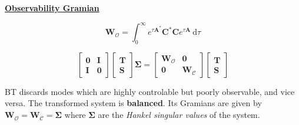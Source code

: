 \documentclass[aspectratio=169, usenames, dvipsnames]{beamer}
\begin{document}
\begin{frame}
  \vfill
  \centering

  \underline{\textbf{Observability Gramian}}

  \Large
  {
    \[
    \bm{W}_{\mathcal{O}} = \displaystyle \int_0^{\infty} e^{\tau \bm{A}^*} \bm{C}^* \bm{C} e^{\tau \bm{A}} \ \mathrm{d}\tau
    \]
  }

  \vfill
\end{frame}


\begin{frame}
  \vfill

  \begin{tcolorbox}[
    enhanced,
    coltitle=black,
    coltext=white,
    colback=black,
    title=\textbf{Balancing transform / Balanced tuncation},
    frame style tile={width=\paperwidth}{background.jpg}
    ]

    \medskip
    \Large

    \[
    \begin{bmatrix}
      \bm{0} & \bm{I} \\
      \bm{I} & \bm{0}
    \end{bmatrix}
    \begin{bmatrix}
      \bm{T} \\ \bm{S}
    \end{bmatrix}
    \boldsymbol{\Sigma}
      =
    \begin{bmatrix}
      \bm{W}_{\mathcal{O}} & \bm{0} \\
      \bm{0} & \bm{W}_{\mathcal{C}}
    \end{bmatrix}
    \begin{bmatrix}
      \bm{T} \\ \bm{S}
    \end{bmatrix}
    \]

    \medskip
  \end{tcolorbox}

  \vfill

  BT discards modes which are highly controlable but poorly observable, and vice versa.
  The transformed system is \textbf{balanced}.
  Its Gramians are given by $\bm{W}_{\mathcal{O}} = \bm{W}_{\mathcal{C}} = \boldsymbol{\Sigma}$ where $\boldsymbol{\Sigma}$ are the \emph{Hankel singular values} of the system.

  \vfill
\end{frame}
\end{document}

